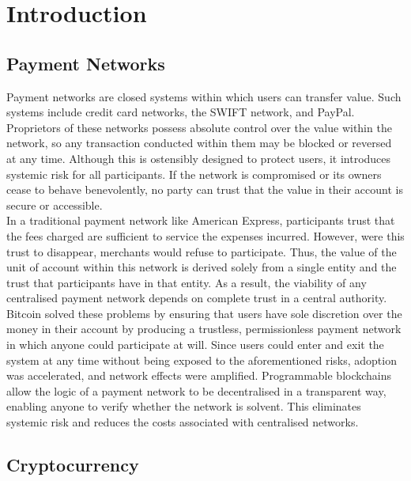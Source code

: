 \section{Introduction}

\subsection{Payment Networks}

\noindent Payment networks are closed systems within which users can transfer
value. Such systems include credit card networks, the SWIFT network, and
PayPal. Proprietors of these networks possess absolute control over the value
within the network, so any transaction conducted within them may be blocked
or reversed at any time. Although this is ostensibly designed to protect
users, it introduces systemic risk for all participants. If the network is
compromised or its owners cease to behave benevolently, no party can trust
that the value in their account is secure or accessible. \\

\noindent In a traditional payment network like American Express,
participants trust that the fees charged are sufficient to service the
expenses incurred. However, were this trust to disappear, merchants would
refuse to participate. Thus, the value of the unit of account within this
network is derived solely from a single entity and the trust that
participants have in that entity. As a result, the viability of any
centralised payment network depends on complete trust in a central authority. \\

\noindent Bitcoin solved these problems by ensuring that users have sole
discretion over the money in their account by producing a trustless,
permissionless payment network in which anyone could participate at will.
Since users could enter and exit the system at any time without being exposed
to the aforementioned risks, adoption was accelerated, and network effects
were amplified. Programmable blockchains allow the logic of a payment network
to be decentralised in a transparent way, enabling anyone to verify whether the
network is solvent. This eliminates systemic risk and reduces the costs associated
with centralised networks.


\subsection{Cryptocurrency}

